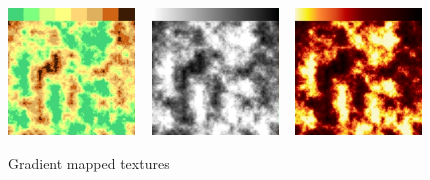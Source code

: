 \begin{figure}
        \centering
                \includegraphics[width=0.3\textwidth]{img/Theory/Perlin_Noise/gradient_discrete.png}
        ~ %
                \includegraphics[width=0.3\textwidth]{img/Theory/Perlin_Noise/gradient_grey.png}
        ~ %
                \includegraphics[width=0.3\textwidth]{img/Theory/Perlin_Noise/gradient_fire.png}
        \caption{Gradient mapped textures \cite{NoisesGAMES}}
        \label{fig:NTextures}
\end{figure}

